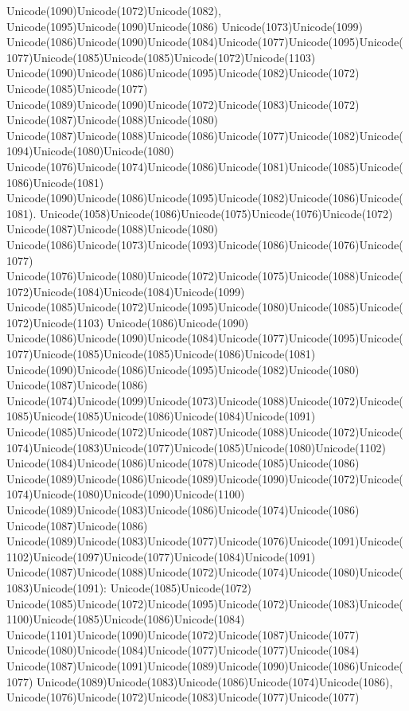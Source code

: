 \documentclass[a4paper,11pt]{report}
\begin{document}
{{Unicode(1090)Unicode(1072)Unicode(1082),
Unicode(1095)Unicode(1090)Unicode(1086) Unicode(1073)Unicode(1099)
Unicode(1086)Unicode(1090)Unicode(1084)Unicode(1077)Unicode(1095)Unicode(1077)Unicode(1085)Unicode(1085)Unicode(1072)Unicode(1103)
Unicode(1090)Unicode(1086)Unicode(1095)Unicode(1082)Unicode(1072)
Unicode(1085)Unicode(1077)
Unicode(1089)Unicode(1090)Unicode(1072)Unicode(1083)Unicode(1072)
Unicode(1087)Unicode(1088)Unicode(1080)
Unicode(1087)Unicode(1088)Unicode(1086)Unicode(1077)Unicode(1082)Unicode(1094)Unicode(1080)Unicode(1080)
Unicode(1076)Unicode(1074)Unicode(1086)Unicode(1081)Unicode(1085)Unicode(1086)Unicode(1081)
Unicode(1090)Unicode(1086)Unicode(1095)Unicode(1082)Unicode(1086)Unicode(1081).
Unicode(1058)Unicode(1086)Unicode(1075)Unicode(1076)Unicode(1072)
Unicode(1087)Unicode(1088)Unicode(1080)
Unicode(1086)Unicode(1073)Unicode(1093)Unicode(1086)Unicode(1076)Unicode(1077)
Unicode(1076)Unicode(1080)Unicode(1072)Unicode(1075)Unicode(1088)Unicode(1072)Unicode(1084)Unicode(1084)Unicode(1099)
Unicode(1085)Unicode(1072)Unicode(1095)Unicode(1080)Unicode(1085)Unicode(1072)Unicode(1103)
Unicode(1086)Unicode(1090)
Unicode(1086)Unicode(1090)Unicode(1084)Unicode(1077)Unicode(1095)Unicode(1077)Unicode(1085)Unicode(1085)Unicode(1086)Unicode(1081)
Unicode(1090)Unicode(1086)Unicode(1095)Unicode(1082)Unicode(1080)
Unicode(1087)Unicode(1086)
Unicode(1074)Unicode(1099)Unicode(1073)Unicode(1088)Unicode(1072)Unicode(1085)Unicode(1085)Unicode(1086)Unicode(1084)Unicode(1091)
Unicode(1085)Unicode(1072)Unicode(1087)Unicode(1088)Unicode(1072)Unicode(1074)Unicode(1083)Unicode(1077)Unicode(1085)Unicode(1080)Unicode(1102)
Unicode(1084)Unicode(1086)Unicode(1078)Unicode(1085)Unicode(1086)
Unicode(1089)Unicode(1086)Unicode(1089)Unicode(1090)Unicode(1072)Unicode(1074)Unicode(1080)Unicode(1090)Unicode(1100)
Unicode(1089)Unicode(1083)Unicode(1086)Unicode(1074)Unicode(1086)
Unicode(1087)Unicode(1086)
Unicode(1089)Unicode(1083)Unicode(1077)Unicode(1076)Unicode(1091)Unicode(1102)Unicode(1097)Unicode(1077)Unicode(1084)Unicode(1091)
Unicode(1087)Unicode(1088)Unicode(1072)Unicode(1074)Unicode(1080)Unicode(1083)Unicode(1091):
Unicode(1085)Unicode(1072)
Unicode(1085)Unicode(1072)Unicode(1095)Unicode(1072)Unicode(1083)Unicode(1100)Unicode(1085)Unicode(1086)Unicode(1084)
Unicode(1101)Unicode(1090)Unicode(1072)Unicode(1087)Unicode(1077)
Unicode(1080)Unicode(1084)Unicode(1077)Unicode(1077)Unicode(1084)
Unicode(1087)Unicode(1091)Unicode(1089)Unicode(1090)Unicode(1086)Unicode(1077)
Unicode(1089)Unicode(1083)Unicode(1086)Unicode(1074)Unicode(1086),
Unicode(1076)Unicode(1072)Unicode(1083)Unicode(1077)Unicode(1077)
}}
\end{document}
